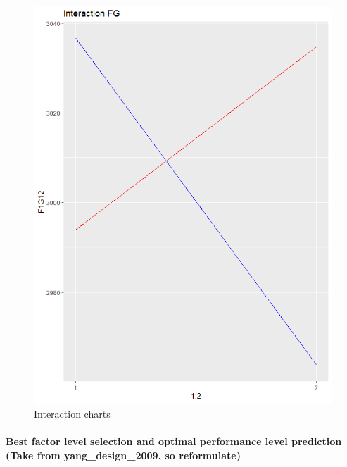 \begin{figure}[H]
\begin{minipage}[b]{0.33\linewidth}
		\includegraphics[width=1\linewidth]{simulations/taguchi/plots/interaction_fg} 
	\end{minipage}
	\caption{Interaction charts}
\end{figure}



\paragraph{Best factor level selection and optimal performance level prediction (Take from yang\_design\_2009, so reformulate)}

